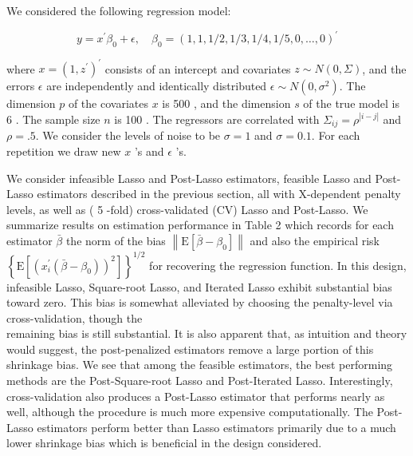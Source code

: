 \documentclass[10pt]{article}
\begin{document}
We considered the following regression model:

\[
y=x^{\prime} \beta_{0}+\epsilon, \quad \beta_{0}=(1,1,1 / 2,1 / 3,1 / 4,1 / 5,0, \ldots, 0)^{\prime}
\]

where \(x=\left(1, z^{\prime}\right)^{\prime}\) consists of an intercept and covariates \(z \sim N(0, \Sigma)\), and the errors \(\epsilon\) are independently and identically distributed \(\epsilon \sim N\left(0, \sigma^{2}\right)\). The dimension \(p\) of the covariates \(x\) is 500 , and the dimension \(s\) of the true model is 6 . The sample size \(n\) is 100 . The regressors are correlated with \(\Sigma_{i j}=\rho^{|i-j|}\) and \(\rho=.5\). We consider the levels of noise to be \(\sigma=1\) and \(\sigma=0.1\). For each repetition we draw new \(x\) 's and \(\epsilon\) 's.

We consider infeasible Lasso and Post-Lasso estimators, feasible Lasso and Post-Lasso estimators described in the previous section, all with X-dependent penalty levels, as well as ( 5 -fold) cross-validated (CV) Lasso and Post-Lasso. We summarize results on estimation performance in Table 2 which records for each estimator \(\bar{\beta}\) the norm of the bias \(\left\|\mathrm{E}\left[\bar{\beta}-\beta_{0}\right]\right\|\) and also the empirical risk \(\left\{\mathrm{E}\left[\left(x_{i}^{\prime}\left(\bar{\beta}-\beta_{0}\right)\right)^{2}\right]\right\}^{1 / 2}\) for recovering the regression function. In this design, infeasible Lasso, Square-root Lasso, and Iterated Lasso exhibit substantial bias toward zero. This bias is somewhat alleviated by choosing the penalty-level via cross-validation, though the\\
remaining bias is still substantial. It is also apparent that, as intuition and theory would suggest, the post-penalized estimators remove a large portion of this shrinkage bias. We see that among the feasible estimators, the best performing methods are the Post-Square-root Lasso and Post-Iterated Lasso. Interestingly, cross-validation also produces a Post-Lasso estimator that performs nearly as well, although the procedure is much more expensive computationally. The Post-Lasso estimators perform better than Lasso estimators primarily due to a much lower shrinkage bias which is beneficial in the design considered.
\end{document}
